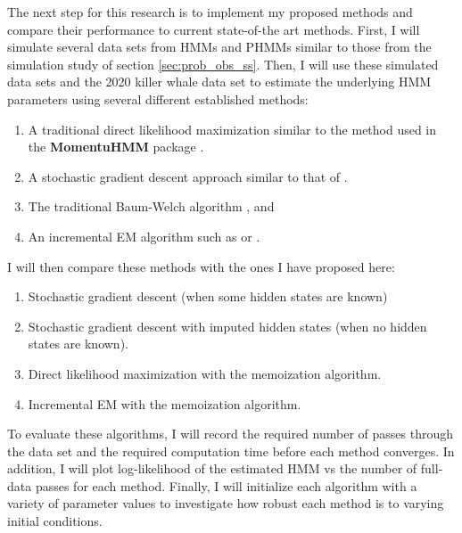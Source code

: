 
%

The next step for this research is to implement my proposed methods and compare their performance to current state-of-the art methods. First, I will simulate several data sets from HMMs and PHMMs similar to those from the simulation study of section \ref{sec:prob_obs_ss}. Then, I will use these simulated data sets and the 2020 killer whale data set to estimate the underlying HMM parameters using several different established methods:

\begin{enumerate}
    \item A traditional direct likelihood maximization similar to the method used in the \textbf{MomentuHMM} package \citep{Blackwell:2016}.
    \item A stochastic gradient descent approach similar to that of \citet{Ye:2017}.
    \item The traditional Baum-Welch algorithm \citep{Baum:1970}, and
    \item An incremental EM algorithm such as \citet{Gotoh:1998} or \citet{Florez:2005}.
\end{enumerate}
%
I will then compare these methods with the ones I have proposed here:
%
\begin{enumerate}
    \item Stochastic gradient descent (when some hidden states are known)
    \item Stochastic gradient descent with imputed hidden states (when no hidden states are known).
    \item Direct likelihood maximization with the memoization algorithm.
    \item Incremental EM with the memoization algorithm.
\end{enumerate}

To evaluate these algorithms, I will record the required number of passes through the data set and the required computation time before each method converges. In addition, I will plot log-likelihood of the estimated HMM vs the number of full-data passes for each method. Finally, I will initialize each algorithm with a variety of parameter values to investigate how robust each method is to varying initial conditions.

